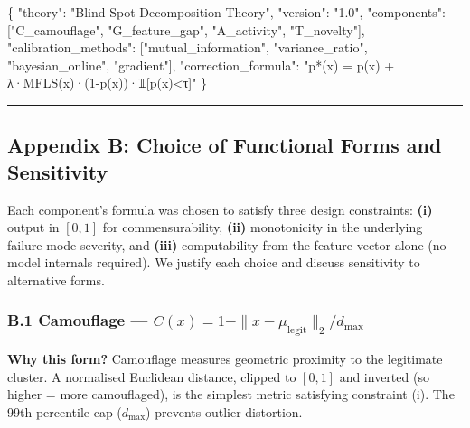 \documentclass[
  11pt,
]{article}
\newenvironment{Shaded}{}{}
\newcommand{\DataTypeTok}[1]{\textcolor[rgb]{0.56,0.13,0.00}{#1}}
\newcommand{\FunctionTok}[1]{\textcolor[rgb]{0.02,0.16,0.49}{#1}}
\newcommand{\OtherTok}[1]{\textcolor[rgb]{0.00,0.44,0.13}{#1}}
\newcommand{\StringTok}[1]{\textcolor[rgb]{0.25,0.44,0.63}{#1}}
\begin{document}
\begin{Shaded}
\begin{Highlighting}[]
\FunctionTok{\{}
  \DataTypeTok{"theory"}\FunctionTok{:} \StringTok{"Blind Spot Decomposition Theory"}\FunctionTok{,}
  \DataTypeTok{"version"}\FunctionTok{:} \StringTok{"1.0"}\FunctionTok{,}
  \DataTypeTok{"components"}\FunctionTok{:} \OtherTok{[}\StringTok{"C\_camouflage"}\OtherTok{,} \StringTok{"G\_feature\_gap"}\OtherTok{,} \StringTok{"A\_activity"}\OtherTok{,} \StringTok{"T\_novelty"}\OtherTok{]}\FunctionTok{,}
  \DataTypeTok{"calibration\_methods"}\FunctionTok{:} \OtherTok{[}\StringTok{"mutual\_information"}\OtherTok{,} \StringTok{"variance\_ratio"}\OtherTok{,} \StringTok{"bayesian\_online"}\OtherTok{,} \StringTok{"gradient"}\OtherTok{]}\FunctionTok{,}
  \DataTypeTok{"correction\_formula"}\FunctionTok{:} \StringTok{"p*(x) = p(x) + λ·MFLS(x)·(1{-}p(x))·𝟙[p(x)\textless{}τ]"}
\FunctionTok{\}}
\end{Highlighting}
\end{Shaded}

\begin{center}\rule{0.5\linewidth}{0.5pt}\end{center}

\subsection{Appendix B: Choice of Functional Forms and
Sensitivity}\label{appendix-b-choice-of-functional-forms-and-sensitivity}

Each component’s formula was chosen to satisfy three design constraints:
\textbf{(i)} output in \([0,1]\) for commensurability, \textbf{(ii)}
monotonicity in the underlying failure-mode severity, and \textbf{(iii)}
computability from the feature vector alone (no model internals
required). We justify each choice and discuss sensitivity to alternative
forms.

\subsubsection{\texorpdfstring{B.1 Camouflage —
\(C(x) = 1 - \|x - \mu_{\text{legit}}\|_2 / d_{\max}\)}{B.1 Camouflage — C(x) = 1 - \textbackslash\textbar x - \textbackslash mu\_\{\textbackslash text\{legit\}\}\textbackslash\textbar\_2 / d\_\{\textbackslash max\}}}\label{b.1-camouflage-cx-1---x---mu_textlegit_2-d_max}

\textbf{Why this form?} Camouflage measures geometric proximity to the
legitimate cluster. A normalised Euclidean distance, clipped to
\([0,1]\) and inverted (so higher = more camouflaged), is the simplest
metric satisfying constraint (i). The 99th-percentile cap (\(d_{\max}\))
prevents outlier distortion.
\end{document}
